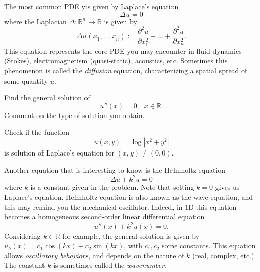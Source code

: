 The most common PDE yis given by Laplace's equation
\[\Delta u = 0\]
where the Laplacian $\Delta: \mathbb{R}^n \to \mathbb{R}$ is given by
\[\Delta u(x_1, \dots, x_n) := \frac{\partial^2 u}{\partial x_1^2} + \dots + \frac{\partial^2 u}{\partial x_n^2}.  \]
This equation represents the core PDE you may encounter in fluid dynamics (Stokes), electromagnetism (quasi-static), acoustics, etc. Sometimes this phenomenon is called the \textit{diffusion} equation, characterizing a spatial spread of some quantity $u$.
\begin{Exercise}
Find the general solution of
\[u''(x) = 0 \quad x \in \mathbb{R}.\]
Comment on the type of solution you obtain. \\
  \dotfill

\dotfill

\dotfill

\dotfill

\dotfill

\dotfill

\dotfill

\dotfill

\dotfill

\dotfill
\end{Exercise}
\begin{Exercise}
Check if the function 
\[ u(x,y) = \log |x^2 + y^2|\]
is solution of Laplace's equation for $(x,y) \neq (0,0)$.\\
  \dotfill

\dotfill

\dotfill

\dotfill

\dotfill

\dotfill

\dotfill

\dotfill

\dotfill

\dotfill
\end{Exercise}
Another equation that is interesting to know is the Helmholtz equation
\[\Delta u + k^2 u = 0\]
where $k$ is a constant given in the problem. Note that setting $k = 0$ gives us Laplace's equation. Helmholtz equation is also known as the wave equation, and this may remind you the mechanical oscillator. Indeed, in 1D this equation becomes a homogeneous second-order linear differential equation
\[ u''(x) + k^2u(x) = 0.\]
Considering $k \in \mathbb{R}$ for example, the general solution is given by $u_h(x) = c_1 \cos(kx) + c_2 \sin(kx)$, with $c_1, c_2$ some constants. This equation allows \textit{oscillatory behaviors}, and depends on the nature of $k$ (real, complex, etc.). The constant $k$ is sometimes called the \textit{wavenumber}.
